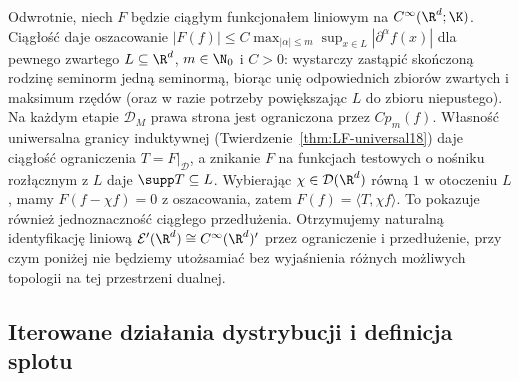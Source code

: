 \begin{uwaga}
\label{rem:Eprime21}
Odwrotnie, niech $F$ będzie ciągłym funkcjonałem liniowym na
$C^\infty(\R^d;\K)$. Ciągłość daje oszacowanie
$|F(f)|\le C\max_{|\alpha|\le m}\sup_{x\in L}|\partial^\alpha f(x)|$
dla pewnego zwartego $L\subseteq\R^d$, $m\in\N_0$ i $C>0$:
wystarczy zastąpić skończoną rodzinę seminorm jedną seminormą,
biorąc unię odpowiednich zbiorów zwartych i maksimum rzędów
(oraz w razie potrzeby powiększając $L$ do zbioru niepustego).
Na każdym etapie $\mathcal D_M$ prawa strona jest ograniczona
przez $Cp_m(f)$. Własność uniwersalna granicy induktywnej
(Twierdzenie~\ref{thm:LF-universal18}) daje ciągłość ograniczenia
$T=F|_{\mathcal D}$, a znikanie $F$ na funkcjach testowych
o nośniku rozłącznym z $L$ daje $\supp T\subseteq L$.
Wybierając $\chi\in\mathcal D(\R^d)$ równą $1$ w otoczeniu $L$, mamy
$F(f-\chi f)=0$ z oszacowania, zatem $F(f)=\langle T,\chi f\rangle$.
To pokazuje również jednoznaczność ciągłego przedłużenia.
Otrzymujemy naturalną identyfikację liniową
$\mathcal E'(\R^d)\cong C^\infty(\R^d)'$ przez ograniczenie
i przedłużenie, przy czym poniżej
nie będziemy utożsamiać bez wyjaśnienia różnych możliwych
topologii na tej przestrzeni dualnej.
\end{uwaga}

\subsection{Iterowane działania dystrybucji i definicja splotu}

